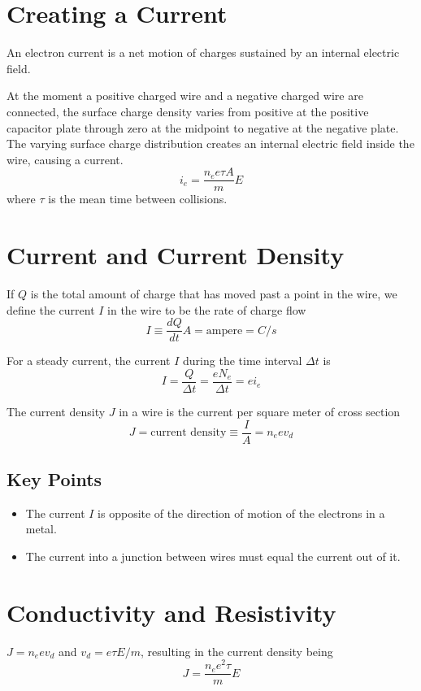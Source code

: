 \documentclass{article}
\begin{document}
\pagebreak

\section*{Creating a Current}
An electron current is a net motion of charges sustained by an internal electric field.
\vspace{1em}

At the moment a positive charged wire and a negative charged wire are connected, the surface charge
density varies from positive at the positive capacitor plate through zero at the midpoint to
negative at the negative plate. The varying surface charge distribution creates an internal
electric field inside the wire, causing a current.
\[i_e=\frac{n_e e \tau A}{m} E\] where $\tau$ is the mean time between collisions.

\section*{Current and Current Density}
If $Q$ is the total amount of charge that has moved past a point in the wire, we define the current
$I$ in the wire to be the rate of charge flow
\[I\equiv \frac{dQ}{dt} A=\text{ampere}=C/s\]
 
For a steady current, the current $I$ during the time interval $\Delta t$ is
\[I=\frac{Q}{\Delta t}=\frac{eN_e}{\Delta t}=ei_e\]

The current density $J$ in a wire is the current per square meter of cross section
\[J=\text{current density}\equiv \frac{I}{A} = n_e e v_d\]
\subsection*{Key Points}
\begin{itemize}
    \item The current $I$ is opposite of the direction of motion of the electrons in a metal.
    \item The current into a junction between wires must equal the current out of it.
\end{itemize}

\pagebreak

\section*{Conductivity and Resistivity}
$J=n_e e v_d$ and $v_d = e\tau E / m$, resulting in the current density being
\[J=\frac{n_e e^2 \tau}{m}E\]
\end{document}
